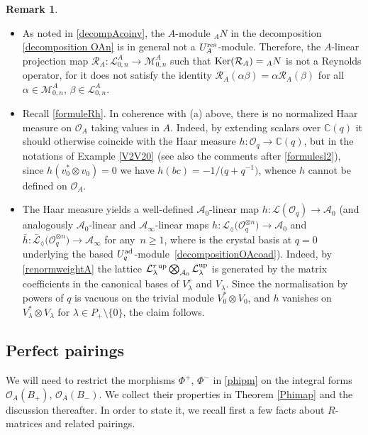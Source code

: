 \documentclass[10pt,a4paper]{amsart}
\numberwithin{equation}{section}
\theoremstyle{definition}
\newtheorem{Remark}[teo]{Remark}
\newcommand{\mc}{\mathbb{C}}
\newcommand{\Ll}{{\mathcal L}}
\newcommand{\Mm}{{\mathcal M}}
\newcommand{\Oo}{{\mathcal O}}
\newcommand{\Rr}{{\mathcal R}}
\newcommand{\ra}{\rightarrow}
\begin{document}
\begin{Remark}\label{noHaarRoverA}\quad
\begin{itemize}\itemsep=0pt
\item[$(a)$] As noted in \eqref{decompAcoinv}, the $A$-module ${}_AN$ in the decomposition \eqref{decomposition OAn} is in general not a $U_A^{\rm res}$-module. Therefore, the $A$-linear projection map $\Rr_A\colon \Ll_{0,n}^A\ra \Mm_{0,n}^A$ such that ${\rm Ker}(\Rr_A)={}_AN$ is not a Reynolds operator, for it does not satisfy the identity $\Rr_A(\alpha \beta) = \alpha \Rr_A(\beta)$ for all $\alpha\in \Mm_{0,n}^A$, $\beta \in \Ll_{0,n}^A$.

\item[$(b)$] Recall \eqref{formuleRh}. In coherence with (a) above, there is no normalized Haar measure on $\Oo_A$ taking values in $A$. Indeed, by extending scalars over $\mc(q)$ it should otherwise coincide with the Haar measure $h\colon \Oo_q \ra \mc(q)$, but in the notations of Example \ref{V2V20} (see also the comments after \eqref{formulesl2}), since $h(v_0^* \otimes v_0)=0$ we have $h(bc)=-1/\big(q+q^{-1}\big)$, whence $h$ cannot be defined on $\Oo_A$.

\item[$(c)$] The Haar measure yields a well-defined $\mathcal{A}_0$-linear map $h\colon \Ll(\Oo_q) \ra \mathcal{A}_0$ (and analogously $\mathcal{A}_0$-linear and $\mathcal{A}_\infty$-linear maps $h\colon \Ll_{\lozenge}\big(\Oo_q^{\otimes n}\big) \ra \mathcal{A}_0$ and $\bar{h}\colon \bar{\Ll}_{\lozenge}\big(\Oo_q^{\otimes n}\big) \ra \mathcal{A}_\infty$ for any~$n\geq 1$, where \smash{$\big(\Ll_{\lozenge}\big(\Oo_q^{\otimes n}\big),\mathcal{B}[[\lambda]]^*\big)$} is the crystal basis at $q=0$ underlying the based $U_q^{\rm ad}$-module~\eqref{decompositionOAcoad}). Indeed, by \eqref{renormweightA} the lattice $\Ll_{\lambda}^r {}^{\rm up} \bigotimes_{\mathcal{A}_0} \Ll_{\lambda}^{\rm up}$ is generated by the matrix coefficients in the canonical bases of $V_\lambda^r$ and $V_\lambda$. Since the normalisation by powers of $q$ is vacuous on the trivial module $V_0^* \otimes V_0$, and $h$ vanishes on $V_\lambda^* \otimes V_\lambda$ for $\lambda \in P_+\setminus \{0\}$, the claim follows.
 \end{itemize}
\end{Remark}

\subsection{Perfect pairings}\label{intdual} We will need to restrict the morphisms $\Phi^+$, $\Phi^-$ in \eqref{phipm} on the integral forms $\Oo_A(B_+)$, $\Oo_A(B_-)$. We collect their properties in Theorem \ref{Phimap} and the discussion thereafter. In order to state it, we recall first a few facts about $R$-matrices and related pairings.
\end{document}
